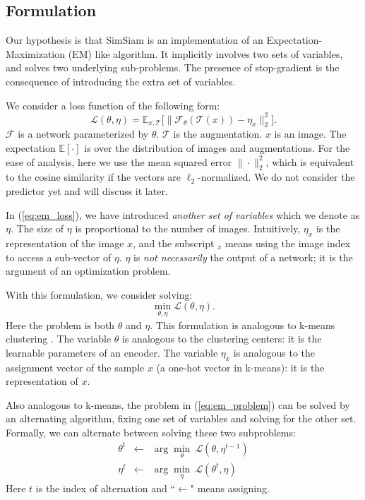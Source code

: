 \documentclass[final]{cvpr}
\begin{document}
\subsection{Formulation}

Our hypothesis is that SimSiam is an implementation of an Expectation-Maximization (EM) like algorithm. It implicitly involves two sets of variables, and solves two underlying sub-problems. The presence of stop-gradient is the consequence of introducing the extra set of variables.

We consider a loss function of the following form:
\begin{equation}
\mathcal{L}(\theta, \eta)=
\mathbb{E}_{x, \mathcal{T}}
\Big[
	\big\|
	\mathcal{F}_\theta(\mathcal{T}(x)) - \eta_{x} 
	\big\|_2^2
\Big].
\label{eq:em_loss}
\end{equation}
$\mathcal{F}$ is a network parameterized by $\theta$.
$\mathcal{T}$ is the augmentation.
$x$ is an image.
The expectation $\mathbb{E}[\cdot]$ is over the distribution of images and augmentations.
For the ease of analysis, here we use the mean squared error $\|\cdot\|^2_2$, which is equivalent to the cosine similarity if the vectors are $\ell_2$-normalized.
We do not consider the predictor yet and will discuss it later.

In (\ref{eq:em_loss}), we have introduced \emph{another set of variables} which we denote as $\eta$.
The size of $\eta$ is proportional to the number of images.
Intuitively, $\eta_x$ is the representation of the image $x$, and the subscript $_x$ means using the image index to access a sub-vector of $\eta$. 
$\eta$ is \emph{not necessarily} the output of a network; it is the argument of an optimization problem.

With this formulation, we consider solving:
\begin{equation}
\min_{\theta, \eta} \mathcal{L}(\theta, \eta).
\label{eq:em_problem}
\end{equation}
Here the problem is \wrt both $\theta$ and $\eta$.
This formulation is analogous to k-means clustering \cite{MacQueen1967}. The variable $\theta$ is analogous to the clustering centers: it is the learnable parameters of an encoder. The variable $\eta_x$ is analogous to the assignment vector of the sample $x$ (a one-hot vector in k-means): it is the representation of $x$. 

Also analogous to k-means, the problem in (\ref{eq:em_problem}) can be solved by an alternating algorithm, fixing one set of variables and solving for the other set. Formally, we can alternate between solving these two subproblems:
\begin{eqnarray}
\theta^t &\leftarrow & \arg\min_{\theta}~\mathcal{L}(\theta, \eta^{t{-}1})
\label{eq:em_subproblem1}
\\
\eta^t &\leftarrow& \arg\min_{\eta}~\mathcal{L}(\theta^t, \eta)
\label{eq:em_subproblem2}
\end{eqnarray}
Here $t$ is the index of alternation and ``$\leftarrow$" means assigning.
\end{document}
